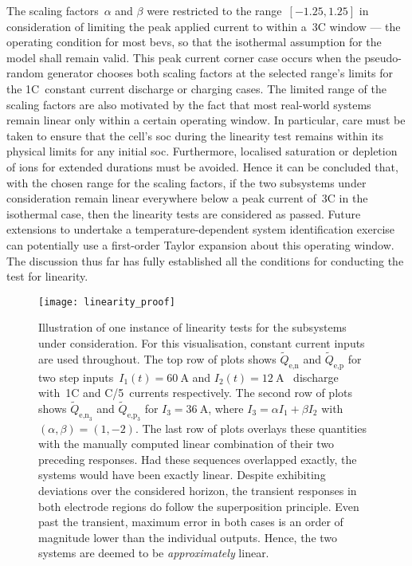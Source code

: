The   scaling   factors~$\alpha$   and    $\beta$   were   restricted   to   the
range~$[-1.25,1.25]$ in  consideration of limiting  the peak applied  current to
within a~\pm 3C window --- the operating condition for most \glspl{bev}, so that
the isothermal  assumption for the model  shall remain valid. This  peak current
corner case occurs when the pseudo-random generator chooses both scaling factors
at the selected range's limits for the 1C~constant current discharge or charging
cases. The limited range  of the scaling factors are also  motivated by the fact
that  most real-world  systems remain  linear  only within  a certain  operating
window. In  particular, care must be  taken to ensure that  the cell's \gls{soc}
during the  linearity test remains  within its  physical limits for  any initial
\gls{soc}. Furthermore, localised  saturation or depletion of  ions for extended
durations must be avoided. Hence it can be concluded that, with the chosen range
for the scaling factors, if the two subsystems under consideration remain linear
everywhere  below a  peak current  of~\pm 3C  in the  isothermal case,  then the
linearity  tests are  considered as  passed.  Future extensions  to undertake  a
temperature-dependent  system  identification  exercise can  potentially  use  a
first-order Taylor  expansion about this  operating window. The  discussion thus
far  has fully  established  all  the conditions  for  conducting  the test  for
linearity.

\begin{figure}[!htbp]
    \centering
    \texttt{[image: linearity\_proof]}
    \caption[Illustration of linearity test for the
     and
     subsystems]{Illustration of one
        instance of linearity tests for the subsystems under consideration. For
        this visualisation, constant current inputs are used throughout. The top
        row of plots shows $\widetilde{Q}_{\text{e,n}}$ and
        $\widetilde{Q}_{\text{e,p}}$ for two step inputs~${I_1(t) =
        \SI{60}{\ampere}}$ and $I_2(t) = \SI{12}{\ampere}$ \ie~discharge with~1C and C/5~currents respectively. The second row of plots shows
        $\widetilde{Q}_{\text{e,n}_3}$ and $\widetilde{Q}_{\text{e,p}_3}$  for
        ${I_3 = \SI{36}{\ampere}}$, where $I_3 = \alpha I_1 + \beta I_2$ with~${(\alpha,\beta) = (1,-2)}$. The last row of plots overlays these
        quantities with the manually computed linear combination of their two
        preceding responses. Had these sequences overlapped exactly, the systems
        would have been exactly linear. Despite exhibiting deviations over the
        considered horizon, the transient responses in both electrode regions do
        follow the superposition principle. Even past the transient, maximum
        error in both cases is an order of magnitude lower than the individual
        outputs. Hence, the two systems are deemed to be \emph{approximately}
        linear.
    }%
    \label{fig:linearity}
\end{figure}

